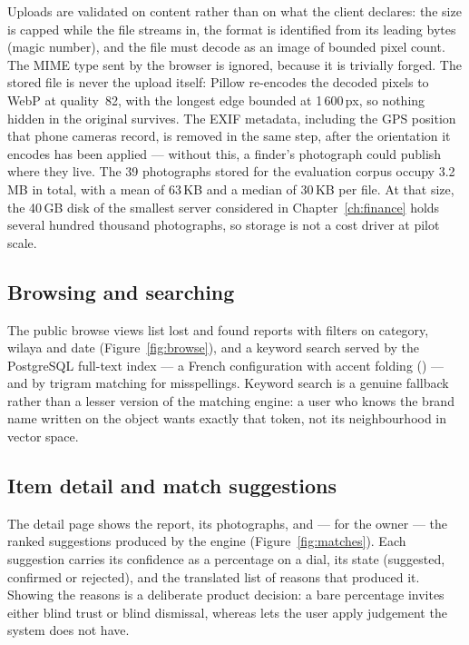 Uploads are validated on content rather than on what the client declares: the
size is capped while the file streams in, the format is identified from its
leading bytes (magic number), and the file must decode as an image of bounded
pixel count. The MIME type sent by the browser is ignored, because it is
trivially forged. The stored file is never the upload itself: Pillow re-encodes
the decoded pixels to WebP at quality~82, with the longest edge bounded at
1\,600\,px, so nothing hidden in the original survives. The EXIF metadata,
including the GPS position that phone cameras record, is removed in the same
step, after the orientation it encodes has been applied --- without this, a
finder's photograph could publish where they live. The 39 photographs stored for the
evaluation corpus occupy 3.2\,MB in total, with a mean of 63\,KB and a median of
30\,KB per file. At that size, the 40\,GB disk of the smallest server considered
in Chapter~\ref{ch:finance} holds several hundred thousand photographs, so
storage is not a cost driver at pilot scale.


\subsection{Browsing and searching}

The public browse views list lost and found reports with filters on category,
wilaya and date (Figure~\ref{fig:browse}), and a keyword search served by the
PostgreSQL full-text index --- a French configuration with accent folding
() --- and by trigram matching for misspellings.
Keyword search is a genuine fallback rather than a lesser version of the
matching engine: a user who knows the brand name written on the object wants
exactly that token, not its neighbourhood in vector space.


\subsection{Item detail and match suggestions}

The detail page shows the report, its photographs, and --- for the owner --- the
ranked suggestions produced by the engine (Figure~\ref{fig:matches}). Each
suggestion carries its confidence as a percentage on a dial, its state
(suggested, confirmed or rejected), and the translated list of reasons that
produced it. Showing the reasons is a
deliberate product decision: a bare percentage invites either blind trust or
blind dismissal, whereas  lets the user apply judgement the system
does not have.

